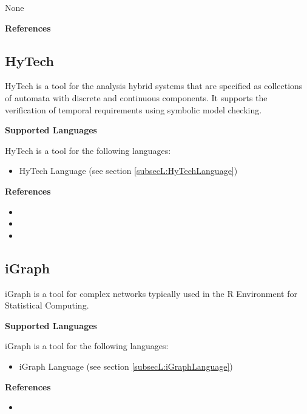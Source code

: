 None


\textbf{References}




\subsection{HyTech}
\label{subsecT:HyTech}


HyTech is a tool for the analysis hybrid systems that are specified as collections of automata with discrete and continuous components. It supports the verification of temporal requirements using symbolic model checking.

\textbf{Supported Languages}

HyTech is a tool for the following languages:
\begin{itemize}
	\item HyTech Language (see section \ref{subsecL:HyTechLanguage})
\end{itemize}


\textbf{References}
\begin{itemize}
	
\item {}
	
\item {}
	
\item {}
\end{itemize}



\subsection{iGraph}
\label{subsecT:iGraph}


iGraph is a tool for complex networks typically used in the R Environment for Statistical Computing.

\textbf{Supported Languages}

iGraph is a tool for the following languages:
\begin{itemize}
	\item iGraph Language (see section \ref{subsecL:iGraphLanguage})
\end{itemize}


\textbf{References}
\begin{itemize}
	
\item {}
\end{itemize}



